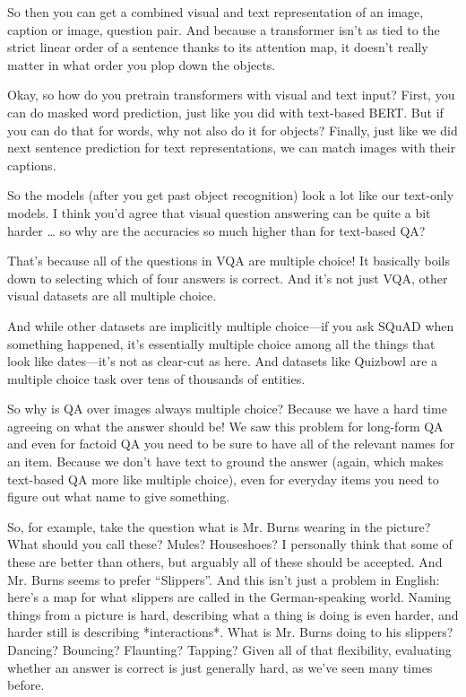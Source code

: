 So then you can get a combined visual and text representation of an image, caption or image, question pair.  And because a transformer isn’t as tied to the strict linear order of a sentence thanks to its attention map, it doesn’t really matter in what order you plop down the objects. 

Okay, so how do you pretrain transformers with visual and text input?  First, you can do masked word prediction, just like you did with text-based BERT.  But if you can do that for words, why not also do it for objects?  Finally, just like we did next sentence prediction for text representations, we can match images with their captions.  

So the models (after you get past object recognition) look a lot like our text-only models.  I think you’d agree that visual question answering can be quite a bit harder … so why are the accuracies so much higher than for text-based QA?

That’s because all of the questions in VQA are multiple choice!  It basically boils down to selecting which of four answers is correct.  And it’s not just VQA, other visual datasets are all multiple choice.  

And while other datasets are implicitly multiple choice—if you ask SQuAD when something happened, it’s essentially multiple choice among all the things that look like dates—it’s not as clear-cut as here.  And datasets like Quizbowl are a multiple choice task over tens of thousands of entities.  

So why is QA over images always multiple choice?  Because we have a hard time agreeing on what the answer should be!  We saw this problem for long-form QA and even for factoid QA you need to be sure to have all of the relevant names for an item.  Because we don’t have text to ground the answer (again, which makes text-based QA more like multiple choice), even for everyday items you need to figure out what name to give something. 

So, for example, take the question what is Mr. Burns wearing in the picture?  What should you call these?  Mules?  Houseshoes?  I personally think that some of these are better than others, but arguably all of these should be accepted.  And Mr. Burns seems to prefer “Slippers”.  And this isn’t just a problem in English: here’s a map for what slippers are called in the German-speaking world.  Naming things from a picture is hard, describing what a thing is doing is even harder, and harder still is describing *interactions*.  What is Mr. Burns doing to his slippers?  Dancing? Bouncing? Flaunting? Tapping?  Given all of that flexibility, evaluating whether an answer is correct is just generally hard, as we’ve seen many times before.

